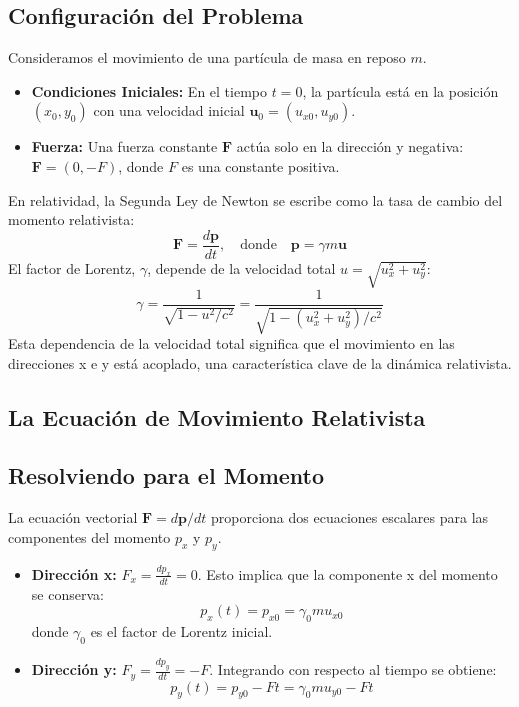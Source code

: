 \documentclass[11pt,a4paper]{article}
\begin{document}
\subsection{Configuración del Problema}
Consideramos el movimiento de una partícula de masa en reposo $m$.
\begin{itemize}
    \item \textbf{Condiciones Iniciales:} En el tiempo $t=0$, la partícula está en la posición $(x_0, y_0)$ con una velocidad inicial $\boldsymbol{u}_0 = (u_{x0}, u_{y0})$.
    \item \textbf{Fuerza:} Una fuerza constante $\boldsymbol{F}$ actúa solo en la dirección y negativa: $\boldsymbol{F} = (0, -F)$, donde $F$ es una constante positiva.
\end{itemize}
En relatividad, la Segunda Ley de Newton se escribe como la tasa de cambio del momento relativista:
\[ \boldsymbol{F} = \frac{d\boldsymbol{p}}{dt}, \quad \text{donde} \quad \boldsymbol{p} = \gamma m \boldsymbol{u} \]
El factor de Lorentz, $\gamma$, depende de la velocidad total $u = \sqrt{u_x^2 + u_y^2}$:
\[ \gamma = \frac{1}{\sqrt{1 - u^2/c^2}} = \frac{1}{\sqrt{1 - (u_x^2 + u_y^2)/c^2}} \]
Esta dependencia de la velocidad total significa que el movimiento en las direcciones x e y está acoplado, una característica clave de la dinámica relativista.

\subsection{La Ecuación de Movimiento Relativista}

\subsection{Resolviendo para el Momento}
La ecuación vectorial $\boldsymbol{F} = d\boldsymbol{p}/dt$ proporciona dos ecuaciones escalares para las componentes del momento $p_x$ y $p_y$.
\begin{itemize}
    \item \textbf{Dirección x:} $F_x = \frac{dp_x}{dt} = 0$. Esto implica que la componente x del momento se conserva:
    \[ p_x(t) = p_{x0} = \gamma_0 m u_{x0} \]
    donde $\gamma_0$ es el factor de Lorentz inicial.
    \item \textbf{Dirección y:} $F_y = \frac{dp_y}{dt} = -F$. Integrando con respecto al tiempo se obtiene:
    \[ p_y(t) = p_{y0} - Ft = \gamma_0 m u_{y0} - Ft \]
\end{itemize}
\end{document}
